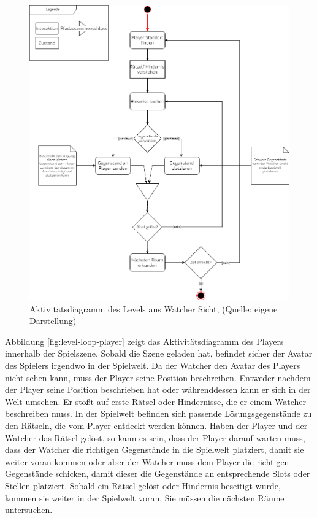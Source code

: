 \begin{figure}[ht]
\centering
\includegraphics[width=1\linewidth]{content/pictures/LevelLoop-Watcher.drawio.png}
\caption{Aktivitätsdiagramm des Levels aus Watcher Sicht, (Quelle: eigene Darstellung)}
\label{fig:level-loop-watcher}
\end{figure}

Abbildung \ref{fig:level-loop-player} zeigt das Aktivitätsdiagramm des Players innerhalb der Spielszene. Sobald die Szene geladen hat, befindet sicher der Avatar des Spielers irgendwo in der Spielwelt. Da der Watcher den Avatar des Players nicht sehen kann, muss der Player seine Position beschreiben. Entweder nachdem der Player seine Position beschrieben hat oder währenddessen kann er sich in der Welt umsehen. Er stößt auf erste Rätsel oder Hindernisse, die er einem Watcher beschreiben muss. In der Spielwelt befinden sich passende Lösungsgegenstände zu den Rätseln, die vom Player entdeckt werden können. Haben der Player und der Watcher das Rätsel gelöst, so kann es sein, dass der Player darauf warten muss, dass der Watcher die richtigen Gegenstände in die Spielwelt platziert, damit sie weiter voran kommen oder aber der Watcher muss dem Player die richtigen Gegenstände schicken, damit dieser die Gegenstände an entsprechende Slots oder Stellen platziert. Sobald ein Rätsel gelöst oder Hindernis beseitigt wurde, kommen sie weiter in der Spielwelt voran. Sie müssen die nächsten Räume untersuchen. 

